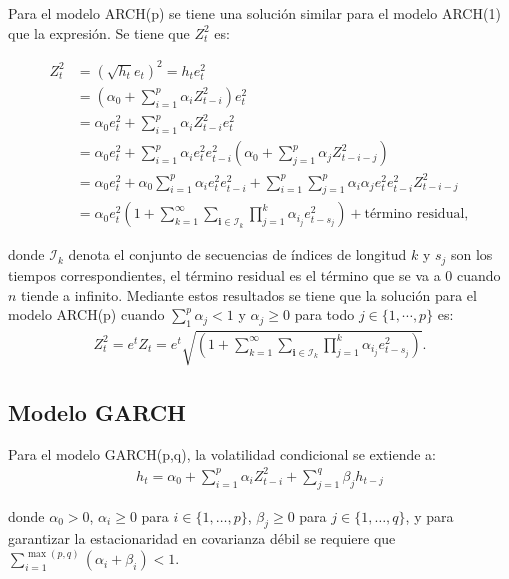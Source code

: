 Para el modelo ARCH(p) se tiene una solución similar para el modelo ARCH(1) que la expresión. Se tiene que $Z_t^2$ es:

\begin{align*}
    Z_t^2 &= \left(\sqrt{h_t} e_t\right)^2 = h_t e_t^2\\
    &= \left(\alpha_0 + \sum_{i=1}^{p} \alpha_i Z_{t-i}^2\right) e_t^2\\
    &= \alpha_0 e_t^2 + \sum_{i=1}^{p} \alpha_i Z_{t-i}^2 e_t^2\\
    &= \alpha_0 e_t^2 + \sum_{i=1}^{p} \alpha_i e_t^2 e_{t-i}^2 \left(\alpha_0 + \sum_{j=1}^{p} \alpha_j Z_{t-i-j}^2\right)\\
    &= \alpha_0 e_t^2 + \alpha_0 \sum_{i=1}^{p} \alpha_i e_t^2 e_{t-i}^2 + \sum_{i=1}^{p} \sum_{j=1}^{p} \alpha_i \alpha_j e_t^2 e_{t-i}^2 Z_{t-i-j}^2\\
    &= \alpha_0 e_t^2 \left(1 + \sum_{k=1}^{\infty} \sum_{\mathbf{i} \in \mathcal{I}_k} \prod_{j=1}^{k} \alpha_{i_j} e_{t-s_j}^2\right) + \text{término residual},
\end{align*}

donde $\mathcal{I}_k$ denota el conjunto de secuencias de índices de longitud $k$ y $s_j$ son los tiempos correspondientes, el término residual es el término que se va a 0 cuando $n$ tiende a infinito. Mediante estos resultados se tiene que la solución para el modelo ARCH(p) cuando $\sum_{1}^p\alpha_j<1 $ y $\alpha_j\geq 0 $ para todo $j\in \{1,\cdots,p\}$ es: 
\begin{align*}
    Z_t^2= e^{t}Z_t=e^t\sqrt{\left(1 + \sum_{k=1}^{\infty} \sum_{\mathbf{i} \in \mathcal{I}_k} \prod_{j=1}^{k} \alpha_{i_j} e_{t-s_j}^2\right)}.
\end{align*}
\newline



\subsection{Modelo GARCH}

Para el modelo GARCH(p,q), la volatilidad condicional se extiende a:
\begin{align*}
    h_t = \alpha_0 + \sum_{i=1}^{p} \alpha_i Z_{t-i}^2 + \sum_{j=1}^{q} \beta_j h_{t-j}
\end{align*}

donde $\alpha_0 > 0$, $\alpha_i \geq 0$ para $i \in \{1, \ldots, p\}$, $\beta_j \geq 0$ para $j \in \{1, \ldots, q\}$, y para garantizar la estacionaridad en covarianza débil se requiere que $\sum_{i=1}^{\max(p,q)} (\alpha_i + \beta_i) < 1$.
\newline

